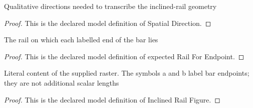 \begin{definition}
  \label{def:physics:phyx-mini-0981:phyxminiproblems-problemphyxmini0981-spatialdirection}
  Qualitative directions needed to transcribe the inclined-rail geometry
\end{definition}
\begin{proof}
  This is the declared model definition of Spatial Direction.
\end{proof}
\begin{definition}
  \label{def:physics:phyx-mini-0981:phyxminiproblems-problemphyxmini0981-expectedrailforendpoint}
  The rail on which each labelled end of the bar lies
\end{definition}
\begin{proof}
  This is the declared model definition of expected Rail For Endpoint.
\end{proof}
\begin{definition}
  \label{def:physics:phyx-mini-0981:phyxminiproblems-problemphyxmini0981-inclinedrailfigure}
  Literal content of the supplied raster. The symbols a and b label bar endpoints; they are not additional scalar lengths
\end{definition}
\begin{proof}
  This is the declared model definition of Inclined Rail Figure.
\end{proof}
